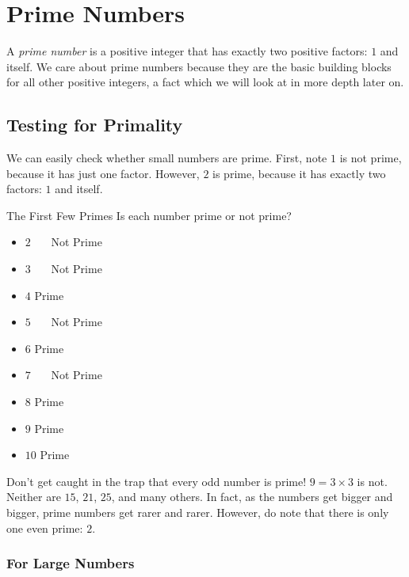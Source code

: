 \documentclass[a4paper,10pt]{report}
\begin{document}
\chapter{Prime Numbers}

A \emph{prime number} is a positive integer that has exactly two positive
factors: \(1\) and itself. We care about prime numbers because they are the
basic building blocks for all other positive integers, a fact which we will
look at in more depth later on.

\section{Testing for Primality}

We can easily check whether small numbers are prime. First, note \(1\) is not
prime, because it has just one factor. However, \(2\) is prime, because it has
exactly two factors: \(1\) and itself.

\begin{problem}{The First Few Primes}
 Is each number prime or not prime?

 \begin{itemize}
  \item \(2\) \hfill {}~~~Not Prime
  \item \(3\) \hfill {}~~~Not Prime
  \item \(4\) \hfill Prime~~~
  \item \(5\) \hfill {}~~~Not Prime
  \item \(6\) \hfill Prime~~~
  \item \(7\) \hfill {}~~~Not Prime
  \item \(8\) \hfill Prime~~~
  \item \(9\) \hfill Prime~~~
  \item \(10\) \hfill Prime~~~
 \end{itemize}
\end{problem}

Don't get caught in the trap that every odd number is prime! \(9=3\times3\) is
not. Neither are \(15\), \(21\), \(25\), and many others. In fact, as the
numbers get bigger and bigger, prime numbers get rarer and rarer. However, do
note that there is only one even prime: \(2\).

\subsection{For Large Numbers}
\end{document}
